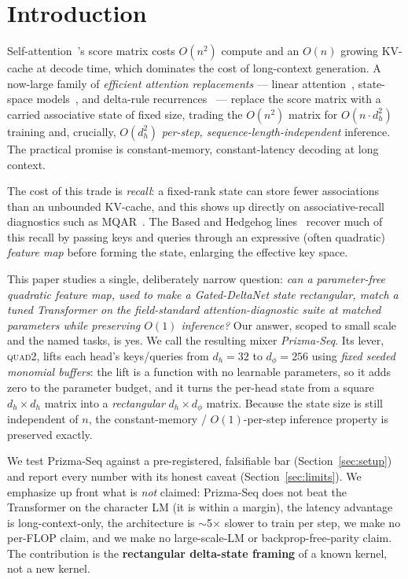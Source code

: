 \documentclass[11pt]{article}
\newcommand{\dphi}{d_{\phi}}
\newcommand{\dhd}{d_{h}}
\newcommand{\quadtwo}{\textsc{quad2}}
\begin{document}
\section{Introduction}
\label{sec:intro}

Self-attention~\cite{vaswani2017attention}'s score matrix costs $O(n^2)$ compute and an $O(n)$
growing KV-cache at decode time, which dominates the cost of long-context generation. A now-large family of \emph{efficient
attention replacements} --- linear attention~\cite{katharopoulos2020transformers}, state-space
models~\cite{gu2022s4,gu2024mamba}, and delta-rule recurrences~\cite{yang2024deltanet,
yang2024gateddeltanet} --- replace the score matrix with a carried associative state of fixed size,
trading the $O(n^2)$ matrix for $O(n\cdot\dhd^2)$ training and, crucially, $O(\dhd^2)$
\emph{per-step, sequence-length-independent} inference. The practical promise is constant-memory,
constant-latency decoding at long context.

The cost of this trade is \emph{recall}: a fixed-rank state can store fewer associations than an
unbounded KV-cache, and this shows up directly on associative-recall diagnostics such as
MQAR~\cite{arora2024zoology}. The Based and Hedgehog lines~\cite{arora2024based,zhang2024hedgehog}
recover much of this recall by passing keys and queries through an expressive (often quadratic)
\emph{feature map} before forming the state, enlarging the effective key space.

This paper studies a single, deliberately narrow question: \emph{can a parameter-free quadratic
feature map, used to make a Gated-DeltaNet state rectangular, match a tuned Transformer on the
field-standard attention-diagnostic suite at matched parameters while preserving $O(1)$
inference?} Our answer, scoped to small scale and the named tasks, is yes. We call the resulting
mixer \emph{Prizma-Seq}. Its lever, \quadtwo, lifts each head's keys/queries from $\dhd{=}32$ to
$\dphi{=}256$ using \emph{fixed seeded monomial buffers}: the lift is a function with no learnable
parameters, so it adds zero to the parameter budget, and it turns the per-head state from a square
$\dhd\times\dhd$ matrix into a \emph{rectangular} $\dhd\times\dphi$ matrix. Because the state size is
still independent of $n$, the constant-memory / $O(1)$-per-step inference property is preserved
exactly.

We test Prizma-Seq against a pre-registered, falsifiable bar (Section~\ref{sec:setup}) and report
every number with its honest caveat (Section~\ref{sec:limits}). We emphasize up front what is
\emph{not} claimed: Prizma-Seq does not beat the Transformer on the character LM (it is within a
margin), the latency advantage is long-context-only, the architecture is $\sim$5$\times$ slower to
train per step, we make no per-FLOP claim, and we make no large-scale-LM or backprop-free-parity
claim. The contribution is the \textbf{rectangular delta-state framing} of a known kernel, not a
new kernel.
\end{document}
